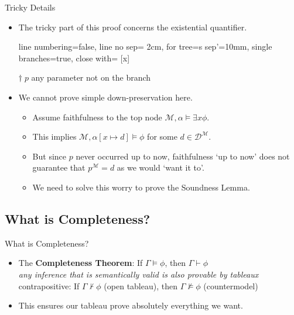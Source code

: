 \begin{frame}{Tricky Details}

	\begin{itemize}%
	\itemsep=16pt
		
	\item The tricky part of this proof concerns the existential quantifier.

	\begin{center}

			\begin{prooftree}
			{
			line numbering=false,
			line no sep= 2cm,
			for tree={s sep'=10mm},
			single branches=true,
			close with=\xmark
			}
			[\exists x\phi [\phi\lbrack x:\!{=}\, p\rbrack^\dagger ] ]
			\end{prooftree}

	\bigskip
	$\dagger\; p$ any parameter not on the branch

	\end{center}

	\item We cannot prove simple down-preservation here.
		\begin{itemize}%
		\item Assume faithfulness to the top node $\mathcal{M},\alpha\vDash\exists x\phi$.
		\item This implies $\mathcal{M},\alpha[x\mapsto d]\vDash\phi$ for some $d\in\mathcal{D}^\mathcal{M}$.
		\item But since $p$ never occurred up to now, faithfulness `up to now' does not guarantee that $p^\mathcal{M}=d$ as we would `want it to'.
		\item We need to solve this worry to prove the Soundness Lemma.
		\end{itemize}

	\end{itemize}

\end{frame}

\subsection{What is Completeness?}
\begin{frame}{What is Completeness?}

	\begin{itemize}%
	\itemsep=16pt
		
	\item The \textbf{Completeness Theorem}: If $\Gamma\vDash\phi$, then $\Gamma\vdash\phi$
	\\
	\alert{\emph{\small{any inference that is semantically valid is also provable by tableaux}}}
	\\
	{\small contrapositive: If $\Gamma\nvdash\phi$ (open tableau), then $\Gamma\nvDash\phi$ (countermodel)}

	\item This ensures our tableau prove absolutely everything we want.

	\end{itemize}

\end{frame}

